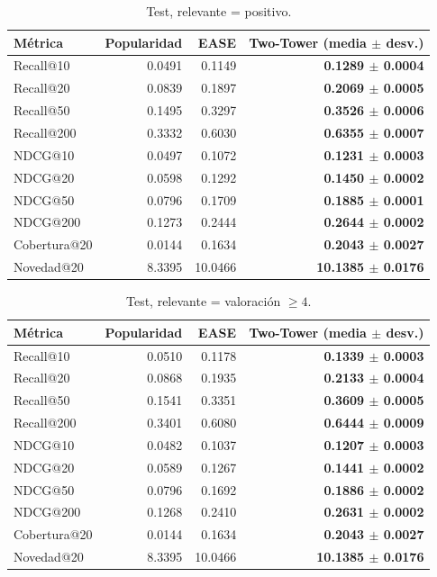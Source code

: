 \begin{table}[H]\centering\small
\begin{tabular}{lrrr}\toprule
Métrica & Popularidad & EASE & Two-Tower (media $\pm$ desv.) \\\midrule
Recall@10 & 0.0491 & 0.1149 & \textbf{0.1289 $\pm$ 0.0004} \\
Recall@20 & 0.0839 & 0.1897 & \textbf{0.2069 $\pm$ 0.0005} \\
Recall@50 & 0.1495 & 0.3297 & \textbf{0.3526 $\pm$ 0.0006} \\
Recall@200 & 0.3332 & 0.6030 & \textbf{0.6355 $\pm$ 0.0007} \\
NDCG@10 & 0.0497 & 0.1072 & \textbf{0.1231 $\pm$ 0.0003} \\
NDCG@20 & 0.0598 & 0.1292 & \textbf{0.1450 $\pm$ 0.0002} \\
NDCG@50 & 0.0796 & 0.1709 & \textbf{0.1885 $\pm$ 0.0001} \\
NDCG@200 & 0.1273 & 0.2444 & \textbf{0.2644 $\pm$ 0.0002} \\
Cobertura@20 & 0.0144 & 0.1634 & \textbf{0.2043 $\pm$ 0.0027} \\
Novedad@20 & 8.3395 & 10.0466 & \textbf{10.1385 $\pm$ 0.0176} \\
\bottomrule\end{tabular}
\caption{Test, relevante = positivo.}\label{tab:test_pos}
\end{table}

\begin{table}[H]\centering\small
\begin{tabular}{lrrr}\toprule
Métrica & Popularidad & EASE & Two-Tower (media $\pm$ desv.) \\\midrule
Recall@10 & 0.0510 & 0.1178 & \textbf{0.1339 $\pm$ 0.0003} \\
Recall@20 & 0.0868 & 0.1935 & \textbf{0.2133 $\pm$ 0.0004} \\
Recall@50 & 0.1541 & 0.3351 & \textbf{0.3609 $\pm$ 0.0005} \\
Recall@200 & 0.3401 & 0.6080 & \textbf{0.6444 $\pm$ 0.0009} \\
NDCG@10 & 0.0482 & 0.1037 & \textbf{0.1207 $\pm$ 0.0003} \\
NDCG@20 & 0.0589 & 0.1267 & \textbf{0.1441 $\pm$ 0.0002} \\
NDCG@50 & 0.0796 & 0.1692 & \textbf{0.1886 $\pm$ 0.0002} \\
NDCG@200 & 0.1268 & 0.2410 & \textbf{0.2631 $\pm$ 0.0002} \\
Cobertura@20 & 0.0144 & 0.1634 & \textbf{0.2043 $\pm$ 0.0027} \\
Novedad@20 & 8.3395 & 10.0466 & \textbf{10.1385 $\pm$ 0.0176} \\
\bottomrule\end{tabular}
\caption{Test, relevante = valoración $\geq 4$.}\label{tab:test_r4}
\end{table}

